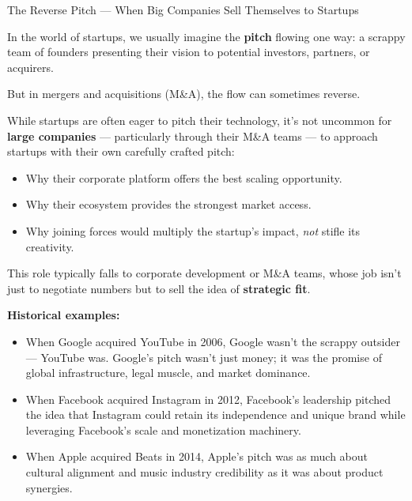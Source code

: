 \begin{HistoricalSidebar}{The Reverse Pitch — When Big Companies Sell Themselves to Startups}

    In the world of startups, we usually imagine the \textbf{pitch} flowing one way:  
    a scrappy team of founders presenting their vision to potential investors, partners, or acquirers.

    \medskip
    
    But in mergers and acquisitions (M\&A), the flow can sometimes reverse.
    
    \medskip
    
    While startups are often eager to pitch their technology, it’s not uncommon for \textbf{large companies} — particularly through their M\&A teams — to approach startups with their own carefully crafted pitch:

    \medskip
    
    \begin{itemize}
        \item Why their corporate platform offers the best scaling opportunity.
        \item Why their ecosystem provides the strongest market access.
        \item Why joining forces would multiply the startup’s impact,  
        \textit{not} stifle its creativity.
    \end{itemize}
    
    \medskip
    
    This role typically falls to corporate development or M\&A teams,  
    whose job isn’t just to negotiate numbers but to sell the idea of \textbf{strategic fit}.
    
    \medskip
    
    \textbf{Historical examples:}

    \medskip

    \begin{itemize}
        \item When Google acquired YouTube in 2006, Google wasn’t the scrappy outsider — YouTube was. Google’s pitch wasn’t just money; it was the promise of global infrastructure, legal muscle, and market dominance.
        \item When Facebook acquired Instagram in 2012, Facebook’s leadership pitched the idea that Instagram could retain its independence and unique brand while leveraging Facebook’s scale and monetization machinery.
        \item When Apple acquired Beats in 2014, Apple’s pitch was as much about cultural alignment and music industry credibility as it was about product synergies.
    \end{itemize}
    

\end{HistoricalSidebar}
